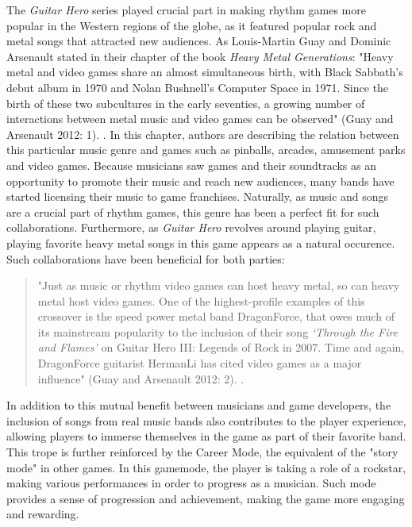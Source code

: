 The \textit{Guitar Hero} series played crucial part in making rhythm games more popular in the Western regions of the globe, as it featured popular rock and metal songs that attracted new audiences. As Louis-Martin Guay and Dominic Arsenault stated in their chapter of the book \textit{Heavy Metal Generations}: "Heavy metal and video games share an almost simultaneous birth, with Black Sabbath’s debut album in 1970 and Nolan Bushnell’s Computer Space in 1971. Since the birth of these two subcultures in the early seventies, a growing number of interactions between metal music and video games can be observed" (Guay and Arsenault 2012: 1). \cite{heavymetal}. In this chapter, authors are describing the relation between this particular music genre and games such as pinballs, arcades, amusement parks and video games. Because musicians saw games and their soundtracks as an opportunity to promote their music and reach new audiences, many bands have started licensing their music to game franchises. Naturally, as music and songs are a crucial part of rhythm games, this genre has been a perfect fit for such collaborations. Furthermore, as \textit{Guitar Hero} revolves around playing guitar, playing favorite heavy metal songs in this game appears as a natural occurence. Such collaborations have been beneficial for both parties:
\begin{quote}
"Just as music or rhythm video games can host heavy metal, so can heavy metal
host video games. One of the highest-profile examples of this crossover is the
speed power metal band DragonForce, that owes much of its mainstream
popularity to the inclusion of their song \textit{‘Through the Fire and Flames’} on Guitar Hero III: Legends of Rock in 2007. Time and again, DragonForce guitarist HermanLi has cited video games as a major influence" (Guay and Arsenault 2012: 2). \cite{heavymetal}.
\end{quote}
In addition to this mutual benefit between musicians and game developers, the inclusion of songs from real music bands also contributes to the player experience, allowing players to immerse themselves in the game as part of their favorite band. This trope is further reinforced by the Career Mode, the equivalent of the "story mode" in other games. In this gamemode, the player is taking a role of a rockstar, making various performances in order to progress as a musician. Such mode provides a sense of progression and achievement, making the game more engaging and rewarding.

